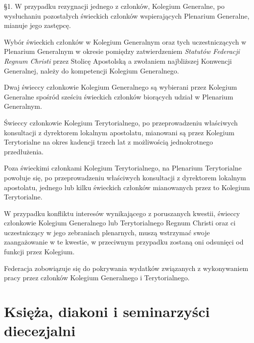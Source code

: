 \S{}1. W przypadku rezygnacji jednego z członków, Kolegium Generalne, po wysłuchaniu pozostałych świeckich członków wspierających Plenarium Generalne, mianuje jego zastępcę.


Wybór świeckich członków w Kolegium Generalnym oraz tych uczestniczących w Plenarium Generalnym w okresie pomiędzy zatwierdzeniem {\em Statutów Federacji Regnum Christi} przez Stolicę Apostolską a zwołaniem najbliższej Konwencji Generalnej, należy do kompetencji Kolegium Generalnego.


 Dwaj świeccy członkowie Kolegium Generalnego są wybierani przez Kolegium Generalne spośród sześciu świeckich członków biorących udział w Plenarium Generalnym.


 Świeccy członkowie Kolegium Terytorialnego, po przeprowadzeniu właściwych konsultacji z dyrektorem lokalnym apostolatu, mianowani są przez Kolegium Terytorialne na okres kadencji trzech lat z możliwością jednokrotnego przedłużenia.


 Poza świeckimi członkami Kolegium Terytorialnego, na Plenarium Terytorialne powołuje się, po przeprowadzeniu właściwych konsultacji z dyrektorem lokalnym apostolatu, jednego lub kilku świeckich członków mianowanych przez to Kolegium Terytorialne.


 W przypadku konfliktu interesów wynikającego z poruszanych kwestii, świeccy członkowie Kolegium Generalnego lub Terytorialnego Regnum Christi oraz ci uczestniczący w jego zebraniach plenarnych, muszą wstrzymać swoje zaangażowanie w te kwestie, w przeciwnym przypadku zostaną oni odsunięci od funkcji przez Kolegium.


 Federacja zobowiązuje się do pokrywania wydatków związanych z wykonywaniem pracy przez członków Kolegium Generalnego i Terytorialnego.

\part{Księża, diakoni i seminarzyści diecezjalni}

